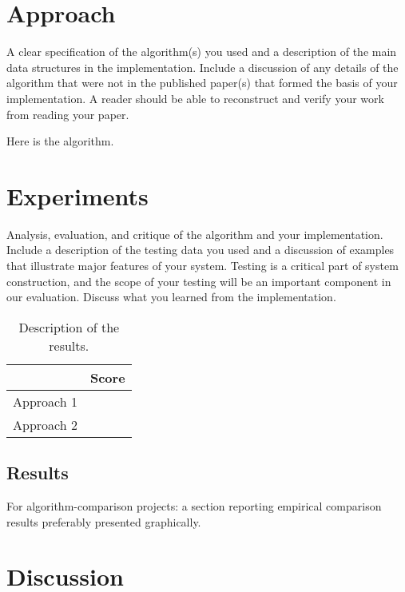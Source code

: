 \documentclass[11pt]{article}
\begin{document}
\section{Approach}

A clear specification of the algorithm(s) you used and a description
of the main data structures in the implementation. Include a
discussion of any details of the algorithm that were not in the
published paper(s) that formed the basis of your implementation. A
reader should be able to reconstruct and verify your work from reading
your paper.

\begin{algorithm}
  \begin{algorithmic}
    \EndProcedure{}
  \end{algorithmic}
  \caption{Here is the algorithm.}
\end{algorithm}



\section{Experiments}
Analysis, evaluation, and critique of the algorithm and your
implementation. Include a description of the testing data you used and
a discussion of examples that illustrate major features of your
system. Testing is a critical part of system construction, and the
scope of your testing will be an important component in our
evaluation. Discuss what you learned from the implementation.

\begin{table}
  \centering
  \begin{tabular}{ll}
    \toprule
    & Score \\
    \midrule
    Approach 1 & \\
    Approach 2 & \\
    \bottomrule
  \end{tabular}
  \caption{Description of the results.}
\end{table}


\subsection{Results}

 For algorithm-comparison projects: a section reporting empirical comparison results preferably presented graphically.


\section{Discussion}
\end{document}
